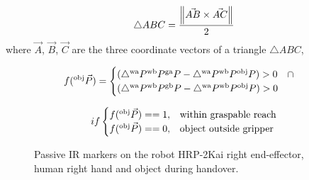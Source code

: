 
\begin{equation}\label{area general}
        \triangle{ABC} = \frac{\norm{ \vec{AB} \times \vec{AC} }} {2} \\
\end{equation}
where $\vec{A}$, $\vec{B}$, $\vec{C}$ are the three coordinate vectors of a triangle $\triangle{ABC}$,


\begin{equation}\label{area}
    \centering
    f({}^\text{obj}\vec{P}) = 
    \begin{cases}
     (\triangle{{}^\text{wa}P {}^\text{wb}P {}^\text{ga}P} - \triangle{{}^\text{wa}P {}^\text{wb}P {}^\text{obj}P}) > 0 \quad \cap \\
     (\triangle{{}^\text{wa}P {}^\text{wb}P {}^\text{gb}P} - \triangle{{}^\text{wa}P {}^\text{wb}P {}^\text{obj}P}) > 0
   \end{cases}         
\end{equation}

\begin{equation}\label{area bool}
    \centering
    if
    \begin{cases}
     f({}^\text{obj}\vec{P})==1, & \text{within graspable reach}  \\
     f({}^\text{obj}\vec{P})==0, & \text{object outside gripper}
   \end{cases}         
\end{equation}



\begin{figure}[ht]
	\caption{Passive IR markers on the robot HRP-2Kai right end-effector, human right hand and object during handover.}
	\label{fig:markerEf2}
\end{figure} 

